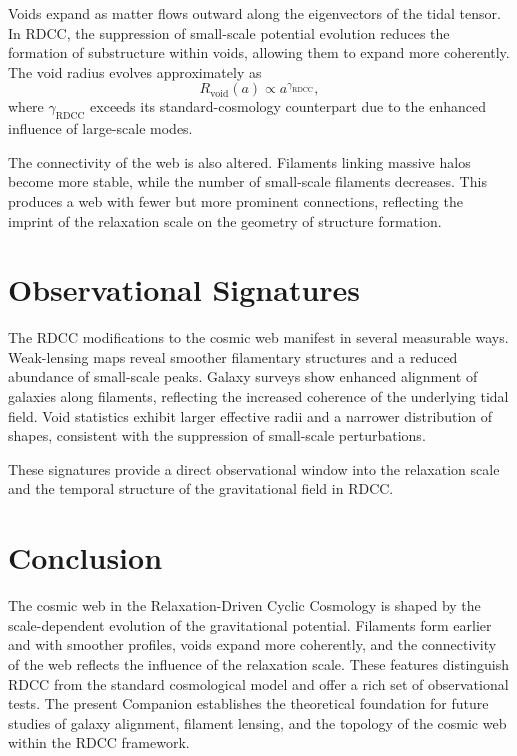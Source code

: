 \documentclass[11pt,a4paper]{article}
\begin{document}
Voids expand as matter flows outward along the eigenvectors of the tidal tensor. 
In RDCC, the suppression of small-scale potential evolution reduces the formation 
of substructure within voids, allowing them to expand more coherently. The void 
radius evolves approximately as
\begin{equation}
    R_{\mathrm{void}}(a)
    \propto a^{\gamma_{\mathrm{RDCC}}},
\end{equation}
where $\gamma_{\mathrm{RDCC}}$ exceeds its standard-cosmology counterpart due to 
the enhanced influence of large-scale modes.

The connectivity of the web is also altered. Filaments linking massive halos become 
more stable, while the number of small-scale filaments decreases. This produces a 
web with fewer but more prominent connections, reflecting the imprint of the 
relaxation scale on the geometry of structure formation.
\section{Observational Signatures}

The RDCC modifications to the cosmic web manifest in several measurable ways. 
Weak-lensing maps reveal smoother filamentary structures and a reduced abundance 
of small-scale peaks. Galaxy surveys show enhanced alignment of galaxies along 
filaments, reflecting the increased coherence of the underlying tidal field. 
Void statistics exhibit larger effective radii and a narrower distribution of 
shapes, consistent with the suppression of small-scale perturbations.

These signatures provide a direct observational window into the relaxation scale 
and the temporal structure of the gravitational field in RDCC.
\section{Conclusion}

The cosmic web in the Relaxation-Driven Cyclic Cosmology is shaped by the 
scale-dependent evolution of the gravitational potential. Filaments form earlier 
and with smoother profiles, voids expand more coherently, and the connectivity of 
the web reflects the influence of the relaxation scale. These features distinguish 
RDCC from the standard cosmological model and offer a rich set of observational 
tests. The present Companion establishes the theoretical foundation for future 
studies of galaxy alignment, filament lensing, and the topology of the cosmic web 
within the RDCC framework.
\end{document}
